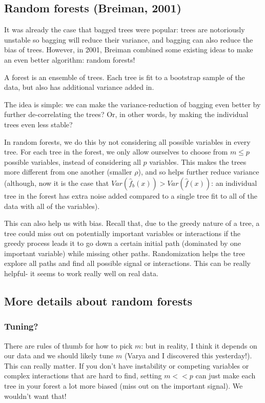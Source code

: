 \subsection{Random forests (Breiman, 2001)}

It was already the case that bagged trees were popular: trees are notoriously unstable so bagging will reduce their variance, and bagging can also reduce the bias of trees. However, in 2001, Breiman combined some existing ideas to make an even better algorithm: random forests!

A forest is an ensemble of trees. Each tree is fit to a bootstrap sample of the data, but also has additional variance added in. 

The idea is simple: we can make the variance-reduction of bagging even better by further de-correlating the trees? Or, in other words, by making the individual trees even less stable? 

In random forests, we do this by not considering all possible variables in every tree. For each tree in the forest, we only allow ourselves to choose from $m \leq p$ possible variables, instead of considering all $p$ variables. This makes the trees more different from one another (smaller $\rho$), and so helps further reduce variance (although, now it is the case that $Var(\hat{f}_b(x)) > Var(\hat{f}(x))$: an individual tree in the forest has extra noise added compared to a single tree fit to all of the data with all of the variables).  

This can also help us with bias. Recall that, due to the greedy nature of a tree, a tree could miss out on potentially important variables or interactions if the greedy process leads it to go down a certain initial path (dominated by one important variable) while missing other paths. Randomization helps the tree explore all paths and find all possible signal or interactions. This can be really helpful- it seems to work really well on real data.

\subsection{More details about random forests}

\subsubsection{Tuning?}

There are rules of thumb for how to pick $m$: but in reality, I think it depends on our data and we should likely tune $m$ (Varya and I discovered this yesterday!). This can really matter. If you don't have instability or competing variables or complex interactions that are hard to find, setting $m << p$ can just make each tree in your forest a lot more biased (miss out on the important signal). We wouldn't want that!

